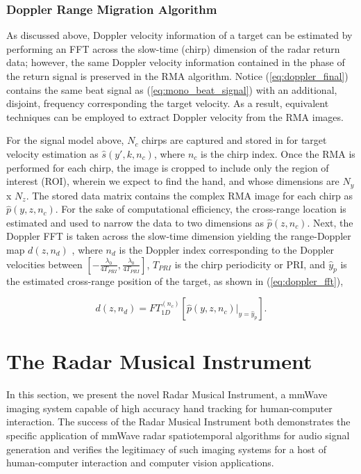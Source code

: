 \documentclass[10pt,journal,final]{IEEEtran}
\begin{document}
\subsubsection{Doppler Range Migration Algorithm}
\label{subsubsec:doppler_rma}
As discussed above, Doppler velocity information of a target can be estimated by performing an FFT across the slow-time (chirp) dimension of the radar return data; however, the same Doppler velocity information contained in the phase of the return signal is preserved in the RMA algorithm. Notice (\ref{eq:doppler_final}) contains the same beat signal as (\ref{eq:mono_beat_signal}) with an additional, disjoint, frequency corresponding the target velocity. As a result, equivalent techniques can be employed to extract Doppler velocity from the RMA images. 

For the signal model above, $N_c$ chirps are captured and stored in for target velocity estimation as $\hat{s}(y',k,n_c)$, where $n_c$ is the chirp index. Once the RMA is performed for each chirp, the image is cropped to include only the region of interest (ROI), wherein we expect to find the hand, and whose dimensions are $N_y$ x $N_z$. The stored data matrix contains the complex RMA image for each chirp as $\hat{p}(y,z,n_c)$. For the sake of computational efficiency, the cross-range location is estimated and used to narrow the data to two dimensions as $\hat{p}(z,n_c)$. Next, the Doppler FFT is taken across the slow-time dimension yielding the range-Doppler map $d(z,n_d)$ \cite{ti:intro_to_FMCW_radars}, where $n_d$ is the Doppler index corresponding to the Doppler velocities between $[-\frac{\lambda_0}{4T_{PRI}},\frac{\lambda_0}{4T_{PRI}}]$, $T_{PRI}$ is the chirp periodicity or PRI, and $\hat{y}_p$ is the estimated cross-range position of the target, as shown in (\ref{eq:doppler_fft}),

\begin{equation}
	\label{eq:doppler_fft}
	d(z,n_d) = FT_{1D}^{(n_c)} \left[ \hat{p}(y,z,n_c) \biggr\rvert_{y = \hat{y}_p} \right].
\end{equation}

\section{The Radar Musical Instrument}
\label{sec:the_radar_musical_instrument}
In this section, we present the novel Radar Musical Instrument, a mmWave imaging system capable of high accuracy hand tracking for human-computer interaction. The success of the Radar Musical Instrument both demonstrates the specific application of mmWave radar spatiotemporal algorithms for audio signal generation and verifies the legitimacy of such imaging systems for a host of human-computer interaction and computer vision applications.
\end{document}
